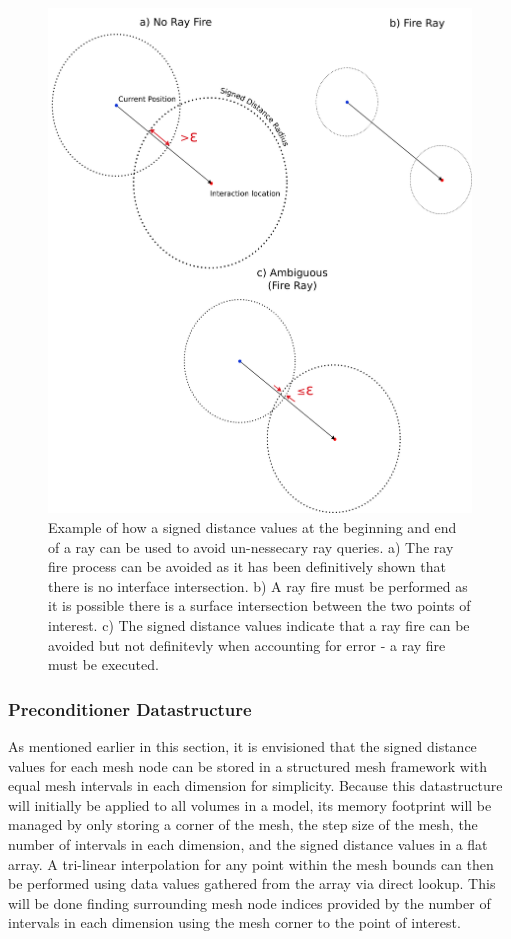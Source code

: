 \documentclass[12pt, a4paper]{article}
\begin{document}
\begin{figure}[H]
  \centering
  \includegraphics[trim = 50 0 0 0 , scale=0.6]{preconditioner_ex.png}
  \caption{Example of how a signed distance values at the beginning and end of a ray can be used to avoid un-nessecary ray queries. a) The ray fire process can be avoided as it has been definitively shown that there is no interface intersection. b) A ray fire must be performed as it is possible there is a surface intersection between the two points of interest. c) The signed distance values indicate that a ray fire can be avoided but not definitevly when accounting for error - a ray fire must be executed.}
  \label{preconditioner_ex}
\end{figure}

\newpage


 \subsubsection{Preconditioner Datastructure}

 As mentioned earlier in this section, it is envisioned that the signed distance values for each mesh node can be stored in a structured mesh framework with equal mesh intervals in each dimension for simplicity. Because this datastructure will initially be applied to all volumes in a model, its memory footprint will be managed by only storing a corner of the mesh, the step size of the mesh, the number of intervals in each dimension, and the signed distance values in a flat array. A tri-linear interpolation for any point within the mesh bounds can then be performed using data values gathered from the array via direct lookup. This will be done finding surrounding mesh node indices provided by the number of intervals in each dimension using the mesh corner to the point of interest.
 
\end{document}
